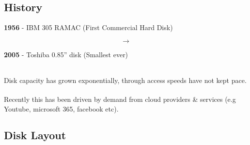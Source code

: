\documentclass{report}
\begin{document}
        \subsection*{History}
            \begin{minipage}[t]{0.4\textwidth}
                \textbf{1956} - IBM 305 RAMAC (First Commercial Hard Disk)
            \end{minipage}
            \begin{minipage}[t]{0.2\textwidth}
                \begin{huge}
                    \[\to\]
                \end{huge}
            \end{minipage}
            \begin{minipage}[t]{0.4\textwidth}
                \textbf{2005} - Toshiba 0.85'' disk (Smallest ever)
            \end{minipage}
            \\ Disk capacity has grown exponentially, through access speeds have not kept pace.
            \\
            \\ Recently this has been driven by demand from cloud providers \& services (e.g Youtube, microsoft 365, facebook etc).
            \\
        
        \subsection*{Disk Layout}
            \begin{minipage}[t]{0.6\textwidth}
            \end{minipage}
            \begin{minipage}[t]{0.4\textwidth}
            \end{minipage}
        
\end{document}
